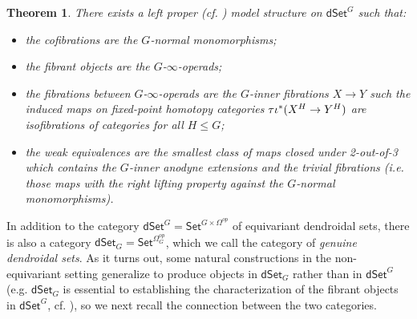 \documentclass[a4paper,10pt
,draft
]{article}%
\numberwithin{equation}{section}
\numberwithin{figure}{section}
\newtheorem{theorem}[equation]{Theorem}%
\theoremstyle{definition} %
\newcommand{\dSet}{\mathsf{dSet}}
\newcommand{\1}{\ensuremath{\mathbbm 1}}%
\begin{document}
\begin{theorem}\label{DSETGMOD THM}
	{\cite[Thm 2.1]{Per18}}
There exists a left proper (cf. \cite[Prop. 8.8]{Per18}) model structure on $\dSet^G$ such that:
\begin{itemize}
	\item the cofibrations are the $G$-normal monomorphisms;
	\item the fibrant objects are the $G$-$\infty$-operads;
	\item the fibrations between
	$G$-$\infty$-operads 
	are the $G$-inner fibrations $X \to Y$
	such the induced maps on 
	fixed-point homotopy categories 
	$\tau \iota^{\**}(X^H \to Y^H)$ are isofibrations of categories for all $H \leq G$;
	\item the weak equivalences are the smallest class of maps closed under 2-out-of-3 which
	contains the $G$-inner anodyne extensions and the trivial fibrations
	(i.e. those maps with the right lifting property against the $G$-normal monomorphisms).
\end{itemize}
\end{theorem}

In addition to the category
$\mathsf{dSet}^G = \mathsf{Set}^{G \times \Omega^{op}}$
of equivariant dendroidal sets,
there is also a category
$\mathsf{dSet}_G = \mathsf{Set}^{\Omega_G^{op}}$,
which we call the category of 
\emph{genuine dendroidal sets}.
As it turns out,
some natural constructions in the non-equivariant setting 
generalize to produce objects in 
$\mathsf{dSet}_G$
rather than in 
$\mathsf{dSet}^G$
(e.g. $\mathsf{dSet}_G$ is essential to establishing the characterization
of the fibrant objects in $\mathsf{dSet}^G$,
cf. \cite[\S 8.2]{Per18}),
so we next recall the connection between the two categories.
\end{document}
